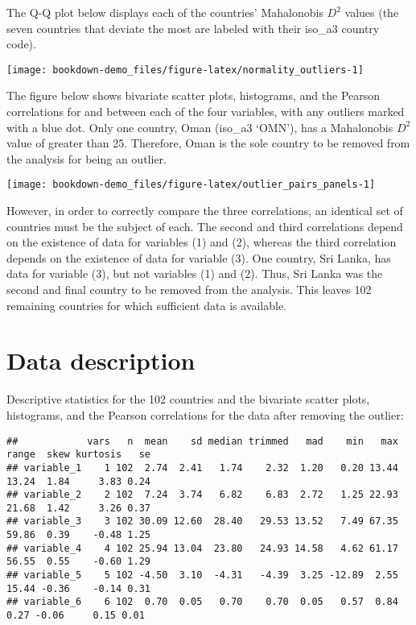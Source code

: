 \documentclass[]{book}
\begin{document}
The Q-Q plot below displays each of the countries' Mahalonobis \(D^{2}\)
values (the seven countries that deviate the most are labeled with their
iso\_a3 country code).

\begin{center}\texttt{[image: bookdown-demo\_files/figure-latex/normality\_outliers-1]} \end{center}

The figure below shows bivariate scatter plots, histograms, and the
Pearson correlations for and between each of the four variables, with
any outliers marked with a blue dot. Only one country, Oman (iso\_a3
`OMN'), has a Mahalonobis \(D^{2}\) value of greater than 25. Therefore,
Oman is the sole country to be removed from the analysis for being an
outlier.

\begin{center}\texttt{[image: bookdown-demo\_files/figure-latex/outlier\_pairs\_panels-1]} \end{center}

However, in order to correctly compare the three correlations, an
identical set of countries must be the subject of each. The second and
third correlations depend on the existence of data for variables (1) and
(2), whereas the third correlation depends on the existence of data for
variable (3). One country, Sri Lanka, has data for variable (3), but not
variables (1) and (2). Thus, Sri Lanka was the second and final country
to be removed from the analysis. This leaves 102 remaining countries for
which sufficient data is available.

\section{Data description}\label{data-description}

Descriptive statistics for the 102 countries and the bivariate scatter
plots, histograms, and the Pearson correlations for the data after
removing the outlier:

\begin{verbatim}
##            vars   n  mean    sd median trimmed   mad    min   max range  skew kurtosis   se
## variable_1    1 102  2.74  2.41   1.74    2.32  1.20   0.20 13.44 13.24  1.84     3.83 0.24
## variable_2    2 102  7.24  3.74   6.82    6.83  2.72   1.25 22.93 21.68  1.42     3.26 0.37
## variable_3    3 102 30.09 12.60  28.40   29.53 13.52   7.49 67.35 59.86  0.39    -0.48 1.25
## variable_4    4 102 25.94 13.04  23.80   24.93 14.58   4.62 61.17 56.55  0.55    -0.60 1.29
## variable_5    5 102 -4.50  3.10  -4.31   -4.39  3.25 -12.89  2.55 15.44 -0.36    -0.14 0.31
## variable_6    6 102  0.70  0.05   0.70    0.70  0.05   0.57  0.84  0.27 -0.06     0.15 0.01
\end{verbatim}
\end{document}

